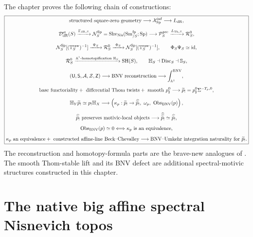 The chapter proves the following chain of constructions:
\[
\boxed{
\begin{gathered}
\text{structured square-zero geometry}
\longrightarrow
\mathcal X_{\mathrm{Sp}}^{\mathrm{inf}}
\longrightarrow
L_{\mathrm{dR}},
\\[2mm]
\mathcal D_{\mathrm{dR}}^{\mathrm{st}}(S)
\xrightarrow{\Gamma_{\mathrm{dR},S}}
\mathcal N_S^{\mathrm{Sp}}
=
\operatorname{Shv}_{\mathrm{Nis}}(\operatorname{Sm}^{\mathrm{fp}}_{/S};\mathrm{Sp})
\longrightarrow
\mathcal P_S^{\mathrm{pre}}
\xrightarrow{L_{\mathrm{Th},S}}
\mathcal R_S^0,
\\[2mm]
\mathcal N_S^{\mathrm{Sp}}[(\mathbb T_S^{\mathrm{raw}})^{-1}]
\xrightarrow{\ \Psi_S\ }
\mathcal R_S^0
\xrightarrow{\ \Phi_S\ }
\mathcal N_S^{\mathrm{Sp}}[(\mathbb T_S^{\mathrm{raw}})^{-1}],
\qquad
\Phi_S\Psi_S\simeq\operatorname{id},
\\[2mm]
\mathcal R_S^0
\xrightarrow{\mathbb A^1\text{-homotopification }\mathbb H_S}
\mathrm{SH}(S),
\qquad
\mathbb H_S\dashv\operatorname{Disc}_S\dashv\mathbb S_S,
\\[2mm]
(\mathsf U,\mathsf S,\mathcal A,\mathcal Z,\mathsf Z)
\longrightarrow
\text{BNV reconstruction}
\longrightarrow
\int_{\mathbb A^1}^{\mathrm{BNV}},
\\[2mm]
\text{base functoriality}
+\text{ differential Thom twists}
+\text{ smooth }p_\sharp^0
\longrightarrow
\widetilde p_!=p_\sharp^0\Sigma^{-T_p,0},
\\[2mm]
\mathbb H_Y\widetilde p_!\simeq p_!\mathbb H_X
\longrightarrow
\left(
  \kappa_p:\widetilde p_!\to\widehat{\widetilde p_!},
  \ \omega_p,
  \ \operatorname{Obs}_{\mathrm{BNV}}(p)
\right),
\\[2mm]
\widehat{\widetilde p_!}\text{ preserves motivic-local objects}
\longrightarrow
\widehat{\widehat{\widetilde p_!}}\simeq\widehat{\widetilde p_!},
\\[2mm]
\operatorname{Obs}_{\mathrm{BNV}}(p)\simeq0
\Longleftrightarrow
\kappa_p\text{ is an equivalence},
\\[2mm]
\kappa_p\text{ an equivalence}
+\text{ constructed affine-line Beck--Chevalley}
\longrightarrow
\text{BNV--Umkehr integration naturality for }\widetilde p_!.
\end{gathered}}
\]
The reconstruction and homotopy-formula parts are the brave-new analogues of
\cite[Proposition~3.5 and Theorem~3.2]{BunkeNikolausVoelkl}.  The smooth
Thom-stable lift and its BNV defect are additional spectral-motivic structures
constructed in this chapter.
\section{The native big affine spectral Nisnevich topos}
\label{sec:infinitesimal-native-topos}

